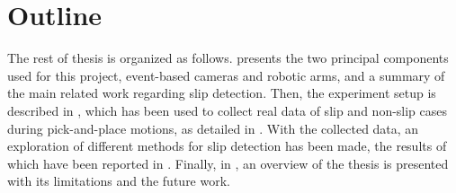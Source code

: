 \section{Outline}

The rest of thesis is organized as follows.  presents the two principal components used for this project, event-based cameras and robotic arms, and a summary of the main related work regarding slip detection. Then, the experiment setup is described in , which has been used to collect real data of slip and non-slip cases during pick-and-place motions, as detailed in . With the collected data, an exploration of different methods for slip detection has been made, the results of which have been reported in . Finally, in , an overview of the thesis is presented with its limitations and the future work.

